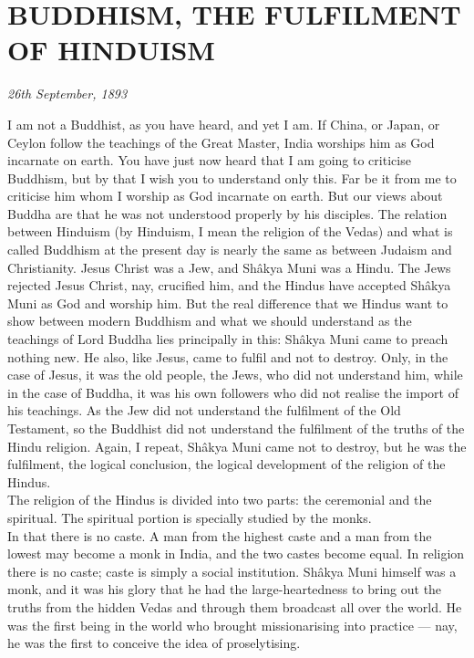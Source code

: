 \section{BUDDHISM, THE FULFILMENT OF HINDUISM}
\begin{center}\textit{ \textit{26th September, 1893}}\end{center}

I am not a Buddhist, as you have heard, and yet I am. If
China, or Japan, or Ceylon follow the teachings of the Great Master,
India worships him as God incarnate on earth. You have just now heard
that I am going to criticise Buddhism, but by that I wish you to
understand only this. Far be it from me to criticise him whom I worship
as God incarnate on earth. But our views about Buddha are that he was
not understood properly by his disciples. The relation between Hinduism
(by Hinduism, I mean the religion of the Vedas) and what is called
Buddhism at the present day is nearly the same as between Judaism and
Christianity. Jesus Christ was a Jew, and Shâkya Muni was a Hindu. The
Jews rejected Jesus Christ, nay, crucified him, and the Hindus have
accepted Shâkya Muni as God and worship him. But the real difference
that we Hindus want to show between modern Buddhism and what we should
understand as the teachings of Lord Buddha lies principally in this:
Shâkya Muni came to preach nothing new. He also, like Jesus, came to
fulfil and not to destroy. Only, in the case of Jesus, it was the old
people, the Jews, who did not understand him, while in the case of
Buddha, it was his own followers who did not realise the import of his
teachings. As the Jew did not understand the fulfilment of the Old
Testament, so the Buddhist did not understand the fulfilment of the
truths of the Hindu religion. Again, I repeat, Shâkya Muni came not to
destroy, but he was the fulfilment, the logical conclusion, the logical
development of the religion of the Hindus.\\

The religion of the Hindus is divided into two parts: the
ceremonial and the spiritual. The spiritual portion is specially
studied by the monks.\\

In that there is no caste. A man from the highest caste and a
man from the lowest may become a monk in India, and the two castes
become equal. In religion there is no caste; caste is simply a social
institution. Shâkya Muni himself was a monk, and it was his glory that
he had the large-heartedness to bring out the truths from the hidden
Vedas and through them broadcast all over the world. He was the first
being in the world who brought missionarising into practice — nay, he
was the first to conceive the idea of proselytising.\\

